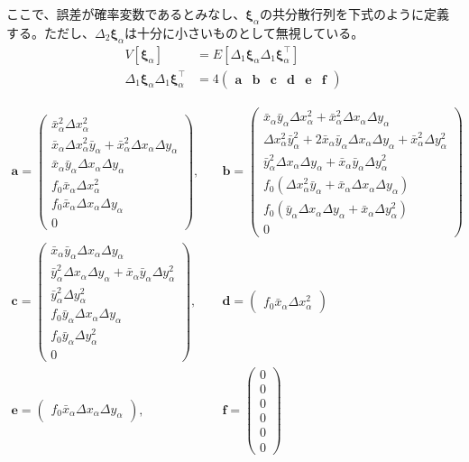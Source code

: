 \documentclass[12pt,a4j]{jsarticle}
\newcommand{\bxa}{\bar{x}_\alpha}
\newcommand{\dxa}{\Delta x_\alpha}
\newcommand{\bya}{\bar{y}_\alpha}
\newcommand{\dya}{\Delta y_\alpha}
\newcommand{\xia}{\bm{\xi}_\alpha}
\begin{document}
      ここで、誤差が確率変数であるとみなし、$\xia$の共分散行列を下式のように定義する。ただし、$\Delta_2\xia$は十分に小さいものとして無視している。
      \begin{align}
        V[\xia] &= E[\Delta_1\xia\Delta_1\xia^\top] \\
        \Delta_1\xia\Delta_1\xia^\top &= 4\begin{pmatrix}
          \bm{a} & \bm{b} & \bm{c} & \bm{d} & \bm{e} & \bm{f}
        \end{pmatrix}
      \end{align}

      \begin{align*}
        \bm{a} = \begin{pmatrix}
          \bxa^2\dxa^2 \\ \bxa\dxa^2\bya + \bxa^2\dxa\dya \\
          \bxa\bya\dxa\dya \\ f_0\bxa\dxa^2 \\
          f_0\bxa\dxa\dya \\ 0
        \end{pmatrix}, \quad& \bm{b} = \begin{pmatrix}
          \bxa\bya\dxa^2 + \bxa^2\dxa\dya \\ \dxa^2\bya^2 + 2\bxa\bya\dxa\dya + \bxa^2\dya^2 \\
          \bya^2\dxa\dya + \bxa\bya\dya^2 \\ f_0(\dxa^2\bya + \bxa\dxa\dya) \\
          f_0(\bya\dxa\dya + \bxa\dya^2) \\ 0
        \end{pmatrix} \\
        \bm{c} = \begin{pmatrix}
          \bxa\bya\dxa\dya \\ \bya^2\dxa\dya + \bxa\bya\dya^2 \\
          \bya^2\dya^2 \\ f_0\bya\dxa\dya \\
          f_0\bya\dya^2 \\ 0
        \end{pmatrix} ,\quad& \bm{d} = \begin{pmatrix}
          f_0\bxa\dxa^2
        \end{pmatrix} \\
        \bm{e} = \begin{pmatrix}
          f_0\bxa\dxa\dya
        \end{pmatrix} ,\quad& \bm{f} = \begin{pmatrix}
          0 \\ 0 \\
          0 \\ 0 \\
          0 \\ 0
        \end{pmatrix}
      \end{align*}
\end{document}
